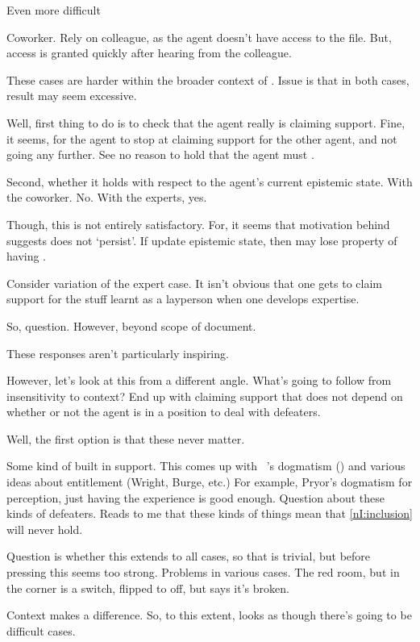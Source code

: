 \begin{note}
  Even more difficult

  Coworker.
  Rely on colleague, as the agent doesn't have access to the file.
  But, access is granted quickly after hearing from the colleague.
\end{note}

\begin{note}
  These cases are harder within the broader context of \ideaCS{}.
  Issue is that in both cases, result may seem excessive.

  Well, first thing to do is to check that the agent really is claiming support.
  Fine, it seems, for the agent to stop at claiming support for the other agent, and not going any further.
  See no reason to hold that the agent must \csN{}.

  Second, whether it holds with respect to the agent's current epistemic state.
  With the coworker.
  No.
  With the experts, yes.

  Though, this is not entirely satisfactory.
  For, it seems that motivation behind \ideaCS{} suggests \csVed{} does not `persist'.
  If update epistemic state, then may lose property of having \csVed{}.

  Consider variation of the expert case.
  It isn't obvious that one gets to claim support for the stuff learnt as a layperson when one develops expertise.

  So, question.
  However, beyond scope of document.
\end{note}

\begin{note}[Uninspiring]
  These responses aren't particularly inspiring.

  However, let's look at this from a different angle.
  What's going to follow from insensitivity to context?
  End up with claiming support that does not depend on whether or not the agent is in a position to deal with defeaters.

  Well, the first option is that these never matter.

  Some kind of built in support.
  This comes up with ~\citeauthor{Pryor:2012tq}'s dogmatism (\cite{Pryor:2000tl,Pryor:2012tq}) and various ideas about entitlement (Wright, Burge, etc.)
  For example, Pryor's dogmatism for perception, just having the experience is good enough.
  Question about these kinds of defeaters.
  Reads to me that these kinds of things mean that \ref{nI:inclusion} will never hold.

  Question is whether this extends to all cases, so that \nI{} is trivial, but before pressing this seems too strong.
  Problems in various cases.
  The red room, but in the corner is a switch, flipped to off, but says it's broken.

  Context makes a difference.
  So, to this extent, looks as though there's going to be difficult cases.
\end{note}

